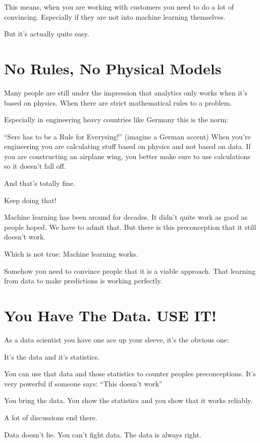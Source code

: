 \documentclass[12pt, numbers=noenddot]{scrreprt} %
\begin{document}
This means, when you are working with customers you need to do a lot of convincing. Especially if they are not into machine learning themselves.

But it's actually quite easy.

\section{No Rules, No Physical Models}

Many people are still under the impression that analytics only works when it’s based on physics. When there are strict mathematical rules to a problem.

Especially in engineering heavy countries like Germany this is the norm:

“Sere has to be a Rule for Everysing!” (imagine a German accent)
When you’re engineering you are calculating stuff based on physics and not based on data. If you are constructing an airplane wing, you better make sure to use calculations so it doesn’t fall off.

And that’s totally fine.

Keep doing that!

Machine learning has been around for decades. It didn’t quite work as good as people hoped. We have to admit that. But there is this preconception that it still doesn’t work.

Which is not true: Machine learning works.

Somehow you need to convince people that it is a viable approach. That learning from data to make predictions is working perfectly.

\section{You Have The Data. USE IT!}

As a data scientist you have one ace up your sleeve, it’s the obvious one:

It’s the data and it’s statistics.

You can use that data and those statistics to counter peoples preconceptions. It’s very powerful if someone says: “This doesn’t work”

You bring the data. You show the statistics and you show that it works reliably.

A lot of discussions end there.

Data doesn’t lie. You can’t fight data.
The data is always right.
\end{document}
